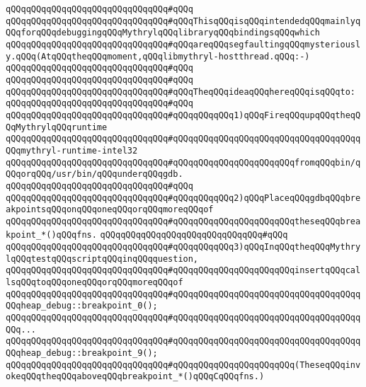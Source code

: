 \verb|qQQqqQQqqQQqqQQqqQQqqQQqqQQqqQQq#qQQq|\newline
\verb|qQQqqQQqqQQqqQQqqQQqqQQqqQQqqQQq#qQQqThisqQQqisqQQqintendedqQQqmainlyqQQqforqQQqdebuggingqQQqMythrylqQQqlibraryqQQqbindingsqQQqwhich|\newline
\verb|qQQqqQQqqQQqqQQqqQQqqQQqqQQqqQQq#qQQqareqQQqsegfaultingqQQqmysteriously.qQQq(AtqQQqtheqQQqmoment,qQQqlibmythryl-hostthread.qQQq:-)|\newline
\verb|qQQqqQQqqQQqqQQqqQQqqQQqqQQqqQQq#qQQq|\newline
\verb|qQQqqQQqqQQqqQQqqQQqqQQqqQQqqQQq#qQQq|\newline
\verb|qQQqqQQqqQQqqQQqqQQqqQQqqQQqqQQq#qQQqTheqQQqideaqQQqhereqQQqisqQQqto:|\newline
\verb|qQQqqQQqqQQqqQQqqQQqqQQqqQQqqQQq#qQQq|\newline
\verb|qQQqqQQqqQQqqQQqqQQqqQQqqQQqqQQq#qQQqqQQqqQQq1)qQQqFireqQQqupqQQqtheqQQqMythrylqQQqruntime|\newline
\verb|qQQqqQQqqQQqqQQqqQQqqQQqqQQqqQQq#qQQqqQQqqQQqqQQqqQQqqQQqqQQqqQQqqQQqqQQqmythryl-runtime-intel32|\newline
\verb|qQQqqQQqqQQqqQQqqQQqqQQqqQQqqQQq#qQQqqQQqqQQqqQQqqQQqqQQqfromqQQqbin/qQQqorqQQq/usr/bin/qQQqunderqQQqgdb.|\newline
\verb|qQQqqQQqqQQqqQQqqQQqqQQqqQQqqQQq#qQQq|\newline
\verb|qQQqqQQqqQQqqQQqqQQqqQQqqQQqqQQq#qQQqqQQqqQQq2)qQQqPlaceqQQqgdbqQQqbreakpointsqQQqonqQQqoneqQQqorqQQqmoreqQQqof|\newline
\verb|qQQqqQQqqQQqqQQqqQQqqQQqqQQqqQQq#qQQqqQQqqQQqqQQqqQQqqQQqtheseqQQqbreakpoint_*()qQQqfns.|\newline
\verb|qQQqqQQqqQQqqQQqqQQqqQQqqQQqqQQq#qQQq|\newline
\verb|qQQqqQQqqQQqqQQqqQQqqQQqqQQqqQQq#qQQqqQQqqQQq3)qQQqInqQQqtheqQQqMythrylqQQqtestqQQqscriptqQQqinqQQqquestion,|\newline
\verb|qQQqqQQqqQQqqQQqqQQqqQQqqQQqqQQq#qQQqqQQqqQQqqQQqqQQqqQQqinsertqQQqcallsqQQqtoqQQqoneqQQqorqQQqmoreqQQqof|\newline
\verb|qQQqqQQqqQQqqQQqqQQqqQQqqQQqqQQq#qQQqqQQqqQQqqQQqqQQqqQQqqQQqqQQqqQQqqQQqheap_debug::breakpoint_0();|\newline
\verb|qQQqqQQqqQQqqQQqqQQqqQQqqQQqqQQq#qQQqqQQqqQQqqQQqqQQqqQQqqQQqqQQqqQQqqQQq...|\newline
\verb|qQQqqQQqqQQqqQQqqQQqqQQqqQQqqQQq#qQQqqQQqqQQqqQQqqQQqqQQqqQQqqQQqqQQqqQQqheap_debug::breakpoint_9();|\newline
\verb|qQQqqQQqqQQqqQQqqQQqqQQqqQQqqQQq#qQQqqQQqqQQqqQQqqQQqqQQq(TheseqQQqinvokeqQQqtheqQQqaboveqQQqbreakpoint_*()qQQqCqQQqfns.)|\newline
